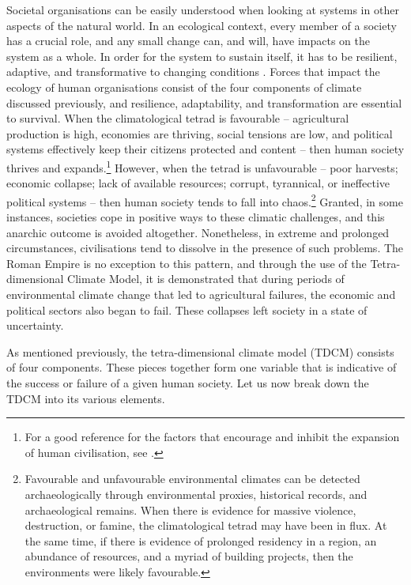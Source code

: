 	Societal organisations can be easily understood when looking at systems in other aspects of the natural world. In an ecological context, every member of a society has a crucial role, and any small change can, and will, have impacts on the system as a whole. In order for the system to sustain itself, it has to be resilient, adaptive, and transformative to changing conditions \parencite{Walker_2004}. Forces that impact the ecology of human organisations consist of the four components of climate discussed previously, and resilience, adaptability, and transformation are essential to survival. When the climatological tetrad is favourable – agricultural production is high, economies are thriving, social tensions are low, and political systems effectively keep their citizens protected and content – then human society thrives and expands.\footnote{For a good reference for the factors that encourage and inhibit the expansion of human civilisation, see \textcite{Diamond_1997}.} 
However, when the tetrad is unfavourable – 
poor harvests; economic collapse; lack of available resources; corrupt, tyrannical, or ineffective political systems – then human society tends to fall into chaos.\footnote{Favourable and unfavourable environmental climates can be detected archaeologically through environmental proxies, historical records, and archaeological remains. When there is evidence for massive violence, destruction, or famine, the climatological tetrad may have been in flux. At the same time, if there is evidence of prolonged residency in a region, an abundance of resources, and a
 myriad of building projects, then the environments were likely favourable.} Granted, in some instances, societies cope in positive ways to these climatic challenges, and this anarchic outcome
 is avoided altogether. Nonetheless, in extreme and prolonged circumstances, civilisations tend to dissolve in the presence of such problems. 
The Roman Empire is no exception to this pattern, and through the use of the Tetra-dimensional Climate Model, it is demonstrated that during periods of environmental climate change that led to agricultural failures, the economic and political sectors also began to fail. These collapses left society in a state of uncertainty. 

As mentioned previously, the tetra-dimensional climate model (TDCM) consists of four components. These pieces together form one variable that is indicative of the success or failure of a given human society. Let us now break down the TDCM into its various elements.

